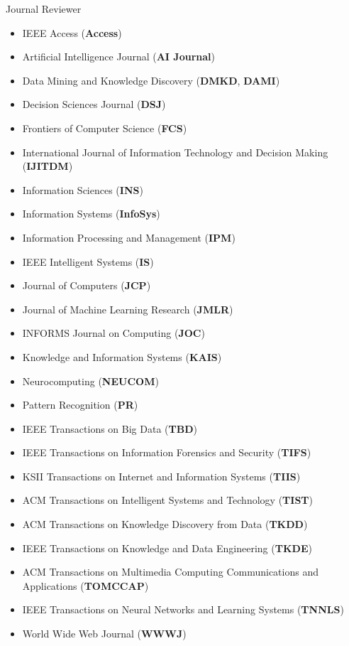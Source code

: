 \documentclass[margin, 9pt]{res}
\begin{document}
\begin{resume}
{Journal Reviewer}
\begin{itemize}
\item IEEE Access (\textbf{Access})
\item Artificial Intelligence Journal (\textbf{AI Journal})	
\item Data Mining and Knowledge Discovery (\textbf{DMKD}, \textbf{DAMI})
\item Decision Sciences Journal (\textbf{DSJ})
\item Frontiers of Computer Science (\textbf{FCS})
\item International Journal of Information Technology and Decision Making (\textbf{IJITDM})
\item Information Sciences (\textbf{INS})
\item Information Systems (\textbf{InfoSys})
\item Information Processing and Management (\textbf{IPM})
\item IEEE Intelligent Systems (\textbf{IS})
\item Journal of Computers (\textbf{JCP})
\item Journal of Machine Learning Research (\textbf{JMLR})
\item INFORMS Journal on Computing (\textbf{JOC})
\item Knowledge and Information Systems (\textbf{KAIS})
\item Neurocomputing (\textbf{NEUCOM})
\item Pattern Recognition (\textbf{PR})
\item IEEE Transactions on Big Data (\textbf{TBD})
\item IEEE Transactions on Information Forensics and Security (\textbf{TIFS})
\item KSII Transactions on Internet and Information Systems (\textbf{TIIS})
\item ACM Transactions on Intelligent Systems and Technology (\textbf{TIST})
\item ACM Transactions on Knowledge Discovery from Data (\textbf{TKDD})
\item IEEE Transactions on Knowledge and Data Engineering (\textbf{TKDE})
\item ACM Transactions on Multimedia Computing Communications and Applications (\textbf{TOMCCAP})
\item IEEE Transactions on Neural Networks and Learning Systems (\textbf{TNNLS})	
\item World Wide Web Journal (\textbf{WWWJ})
\end{itemize}


\end{resume}
\end{document}
